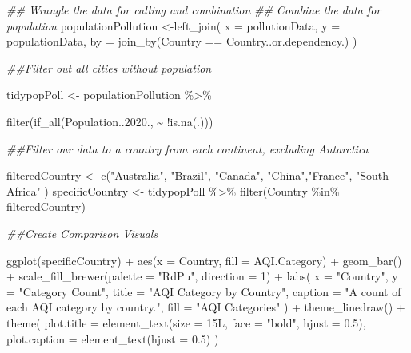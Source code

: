 \documentclass[
  letterpaper,
  DIV=11,
  numbers=noendperiod]{scrartcl}
\newenvironment{Shaded}{\begin{snugshade}}{\end{snugshade}}
\newcommand{\AttributeTok}[1]{\textcolor[rgb]{0.40,0.45,0.13}{#1}}
\newcommand{\DecValTok}[1]{\textcolor[rgb]{0.68,0.00,0.00}{#1}}
\newcommand{\DocumentationTok}[1]{\textcolor[rgb]{0.37,0.37,0.37}{\textit{#1}}}
\newcommand{\FloatTok}[1]{\textcolor[rgb]{0.68,0.00,0.00}{#1}}
\newcommand{\FunctionTok}[1]{\textcolor[rgb]{0.28,0.35,0.67}{#1}}
\newcommand{\NormalTok}[1]{\textcolor[rgb]{0.00,0.23,0.31}{#1}}
\newcommand{\OtherTok}[1]{\textcolor[rgb]{0.00,0.23,0.31}{#1}}
\newcommand{\SpecialCharTok}[1]{\textcolor[rgb]{0.37,0.37,0.37}{#1}}
\newcommand{\StringTok}[1]{\textcolor[rgb]{0.13,0.47,0.30}{#1}}
\begin{document}
\begin{Shaded}
\begin{Highlighting}[]
\DocumentationTok{\#\# Wrangle the data for calling and combination}
\DocumentationTok{\#\# Combine the data for population}
\NormalTok{populationPollution }\OtherTok{\textless{}{-}}\FunctionTok{left\_join}\NormalTok{(}
  \AttributeTok{x =}\NormalTok{ pollutionData,}
  \AttributeTok{y =}\NormalTok{ populationData,}
  \AttributeTok{by =} \FunctionTok{join\_by}\NormalTok{(Country }\SpecialCharTok{==} \StringTok{\textquotesingle{}Country..or.dependency.\textquotesingle{}}\NormalTok{)}
\NormalTok{)}


\DocumentationTok{\#\#Filter out all cities without population}

\NormalTok{tidypopPoll }\OtherTok{\textless{}{-}}\NormalTok{ populationPollution }\SpecialCharTok{\%\textgreater{}\%}

\FunctionTok{filter}\NormalTok{(}\FunctionTok{if\_all}\NormalTok{(Population..}\FloatTok{2020.}\NormalTok{, }\SpecialCharTok{\textasciitilde{}} \SpecialCharTok{!}\FunctionTok{is.na}\NormalTok{(.)))}

\DocumentationTok{\#\#Filter our data to a country from each continent, excluding Antarctica}

\NormalTok{filteredCountry }\OtherTok{\textless{}{-}} \FunctionTok{c}\NormalTok{(}\StringTok{"Australia"}\NormalTok{, }\StringTok{"Brazil"}\NormalTok{, }\StringTok{"Canada"}\NormalTok{, }\StringTok{"China"}\NormalTok{,}\StringTok{"France"}\NormalTok{, }\StringTok{"South Africa"}\NormalTok{  )}
\NormalTok{specificCountry }\OtherTok{\textless{}{-}}\NormalTok{ tidypopPoll }\SpecialCharTok{\%\textgreater{}\%}  
  \FunctionTok{filter}\NormalTok{(Country }\SpecialCharTok{\%in\%}\NormalTok{ filteredCountry)}


\DocumentationTok{\#\#Create Comparison Visuals}

\FunctionTok{ggplot}\NormalTok{(specificCountry) }\SpecialCharTok{+}
  \FunctionTok{aes}\NormalTok{(}\AttributeTok{x =}\NormalTok{ Country, }\AttributeTok{fill =}\NormalTok{ AQI.Category) }\SpecialCharTok{+}
  \FunctionTok{geom\_bar}\NormalTok{() }\SpecialCharTok{+}
  \FunctionTok{scale\_fill\_brewer}\NormalTok{(}\AttributeTok{palette =} \StringTok{"RdPu"}\NormalTok{, }\AttributeTok{direction =} \DecValTok{1}\NormalTok{) }\SpecialCharTok{+}
  \FunctionTok{labs}\NormalTok{(}
    \AttributeTok{x =} \StringTok{"Country"}\NormalTok{,}
    \AttributeTok{y =} \StringTok{"Category Count"}\NormalTok{,}
    \AttributeTok{title =} \StringTok{"AQI Category by Country"}\NormalTok{,}
    \AttributeTok{caption =} \StringTok{"A count of each AQI category by country."}\NormalTok{,}
    \AttributeTok{fill =} \StringTok{"AQI Categories"}
\NormalTok{  ) }\SpecialCharTok{+}
  \FunctionTok{theme\_linedraw}\NormalTok{() }\SpecialCharTok{+}
  \FunctionTok{theme}\NormalTok{(}
    \AttributeTok{plot.title =} \FunctionTok{element\_text}\NormalTok{(}\AttributeTok{size =} \DecValTok{15}\NormalTok{L,}
    \AttributeTok{face =} \StringTok{"bold"}\NormalTok{,}
    \AttributeTok{hjust =} \FloatTok{0.5}\NormalTok{),}
    \AttributeTok{plot.caption =} \FunctionTok{element\_text}\NormalTok{(}\AttributeTok{hjust =} \FloatTok{0.5}\NormalTok{)}
\NormalTok{  )}
 


\end{Highlighting}
\end{Shaded}
\end{document}

